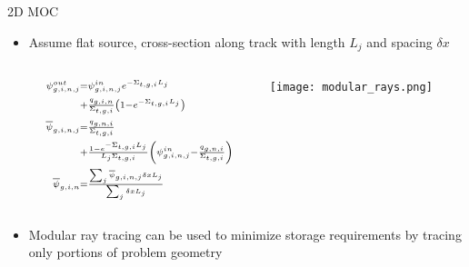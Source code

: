 \begin{frame}[t]{2D MOC}

    \begin{itemize}
      \item Assume flat source, cross-section along track with 
      length $L_j$ and spacing $\delta x$
      \begin{columns}
        \begin{column}{0.6\textwidth}
      \begin{align*}\scriptstyle
      \psi^{out}_{g,i,n,j} &\scriptstyle = \psi^{in}_{g,i,n,j}e^{-\Sigma_{t,g,i} 
      L_j} 
      \\\scriptstyle
      &\scriptstyle + \frac{q_{g,i,n}}{\Sigma_{t,g,i}}\left(1 - 
      e^{-\Sigma_{t,g,i}L_j}\right) \\\scriptstyle
      \overline{\psi}_{g,i,n,j} &\scriptstyle = 
      \frac{q_{g,n,i}}{\Sigma_{t,g,i}} 
      \\\scriptstyle
      &\scriptstyle + \frac{1 - e^{-\Sigma_{t,g,i} 
          L_j}}{L_j\Sigma_{t,g,i}}\left(\psi^{in}_{g,i,n,j} - 
      \frac{q_{g,n,i}}{\Sigma_{t,g,i}}\right) \\\scriptstyle
      \overline{\psi}_{g,i,n} &\scriptstyle = \frac{\sum_j 
      \overline{\psi}_{g,i,n,j} \delta x L_j}{\sum_j \delta x L_j}
      \end{align*}
    \end{column}
  \begin{column}{0.4\textwidth}
  \texttt{[image: modular\_rays.png]}
\end{column}
\end{columns}
      \item Modular ray tracing can be used to minimize storage requirements by 
      tracing only portions of problem geometry
    \end{itemize}

\end{frame} 


